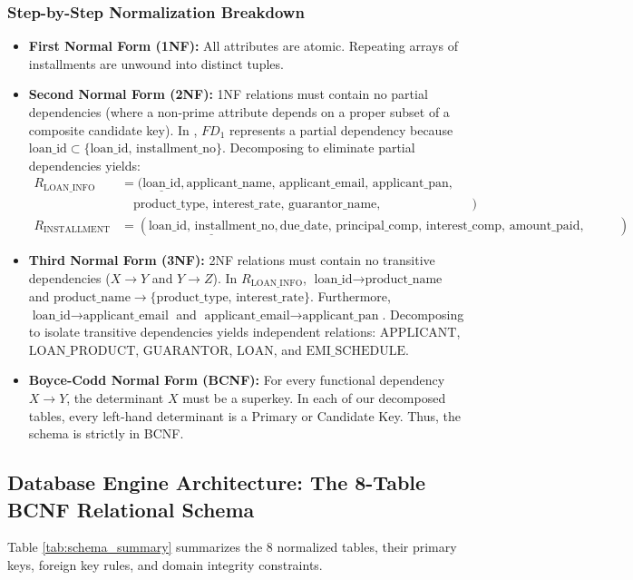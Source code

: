 \documentclass[11pt,a4paper]{report}
\begin{document}
\subsubsection{Step-by-Step Normalization Breakdown}
\begin{itemize}
    \item \textbf{First Normal Form (1NF):} All attributes are atomic. Repeating arrays of installments are unwound into distinct tuples.
    \item \textbf{Second Normal Form (2NF):} 1NF relations must contain no partial dependencies (where a non-prime attribute depends on a proper subset of a composite candidate key). 
    In , $FD_1$ represents a partial dependency because $\text{loan\_id} \subset \{\text{loan\_id, installment\_no}\}$. Decomposing to eliminate partial dependencies yields:
    \begin{align*}
        R_{\text{LOAN\_INFO}} &= (\underline{\text{loan\_id}}, \text{applicant\_name, applicant\_email, applicant\_pan, product\_name,} \\
        &\quad \text{product\_type, interest\_rate, guarantor\_name, guarantor\_phone, principal, tenure, emi\_amount}) \\
        R_{\text{INSTALLMENT}} &= (\underline{\text{loan\_id, installment\_no}}, \text{due\_date, principal\_comp, interest\_comp, amount\_paid, payment\_date})
    \end{align*}
    \item \textbf{Third Normal Form (3NF):} 2NF relations must contain no transitive dependencies ($X \rightarrow Y$ and $Y \rightarrow Z$).
    In $R_{\text{LOAN\_INFO}}$, $\text{loan\_id} \rightarrow \text{product\_name}$ and $\text{product\_name} \rightarrow \{\text{product\_type, interest\_rate}\}$. Furthermore, $\text{loan\_id} \rightarrow \text{applicant\_email}$ and $\text{applicant\_email} \rightarrow \text{applicant\_pan}$. 
    Decomposing to isolate transitive dependencies yields independent relations:
    $\text{APPLICANT}$, $\text{LOAN\_PRODUCT}$, $\text{GUARANTOR}$, $\text{LOAN}$, and $\text{EMI\_SCHEDULE}$.
    \item \textbf{Boyce-Codd Normal Form (BCNF):} For every functional dependency $X \rightarrow Y$, the determinant $X$ must be a superkey. In each of our decomposed tables, every left-hand determinant is a Primary or Candidate Key. Thus, the schema is strictly in BCNF.
\end{itemize}

\subsection{Database Engine Architecture: The 8-Table BCNF Relational Schema}
Table \ref{tab:schema_summary} summarizes the 8 normalized tables, their primary keys, foreign key rules, and domain integrity constraints.
\end{document}
